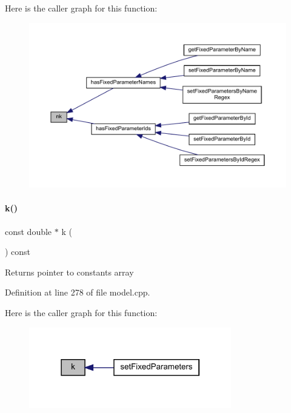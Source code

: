 Here is the caller graph for this function\+:
\nopagebreak
\begin{figure}[H]
\begin{center}
\leavevmode
\includegraphics[width=350pt]{classamici_1_1_model_a3d4130da64883565a06a86e7d6029da1_icgraph}
\end{center}
\end{figure}
\mbox{\label{classamici_1_1_model_adde50e0d8a99d20354c8403bf93fab6f}} 
\paragraph{\texorpdfstring{k()}{k()}}
{\footnotesize\ttfamily const double $\ast$ k (\begin{DoxyParamCaption}{ }\end{DoxyParamCaption}) const}

\begin{DoxyReturn}{Returns}
pointer to constants array 
\end{DoxyReturn}


Definition at line 278 of file model.\+cpp.

Here is the caller graph for this function\+:
\nopagebreak
\begin{figure}[H]
\begin{center}
\leavevmode
\includegraphics[width=250pt]{classamici_1_1_model_adde50e0d8a99d20354c8403bf93fab6f_icgraph}
\end{center}
\end{figure}
\mbox{\label{classamici_1_1_model_ac6ea00eafac9ec7be198bca04b19f4c3}} 
